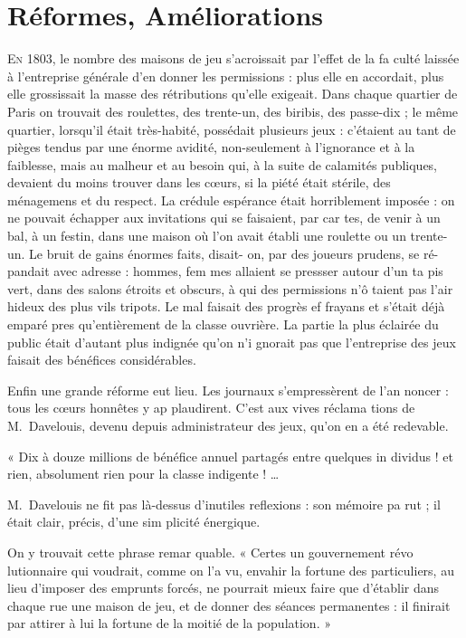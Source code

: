 \chapter
  [Réformes, améliorations]
  {Réformes, Améliorations}

\lettrine{E}{n} 1803, le nombre des maisons de
jeu s'acroissait par l'effet de la fa%
culté laissée à l'entreprise générale
d'en donner les permissions : plus elle
en accordait, plus elle grossissait la
masse des rétributions qu'elle exigeait.
Dans chaque quartier de Paris on
trouvait des roulettes, des trente-un,
des biribis, des passe-dix ; le même
quartier, lorsqu'il était très-habité,
possédait plusieurs jeux : c'étaient au%
tant de pièges tendus par une énorme
avidité, non-seulement à l'ignorance
et à la faiblesse, mais au malheur et
au besoin qui, à la suite de calamités
publiques, devaient du moins trouver
dans les c{\oe}urs, si la piété était stérile,
des ménagemens et du respect. La
crédule espérance était horriblement
imposée : on ne pouvait échapper aux
invitations qui se faisaient, par car%
tes, de venir à un bal, à un festin,
dans une maison où l'on avait établi
une roulette ou un trente-un. Le
bruit de gains énormes faits, disait-%
on, par des joueurs prudens, se ré-%
pandait avec adresse : hommes, fem%
mes allaient se pressser autour d'un ta%
pis vert, dans des salons étroits et
obscurs, à qui des permissions n'ô%
taient pas l'air hideux des plus vils
tripots. Le mal faisait des progrès ef%
frayans et s'était déjà emparé pres%
qu'entièrement de la classe ouvrière.
La partie la plus éclairée du public
était d'autant plus indignée qu'on n'i%
gnorait pas que l'entreprise des jeux
faisait des bénéfices considérables.

Enfin une grande réforme eut lieu.
Les journaux s'empressèrent de l'an%
noncer : tous les c{\oe}urs honnêtes y ap%
plaudirent. C'est aux vives réclama%
tions de M.~Davelouis, devenu depuis
administrateur des jeux, qu'on en a 
été redevable.

« Dix à douze millions de bénéfice
annuel partagés entre quelques in%
dividus ! et rien, absolument rien pour
la classe indigente ! \ldots

M.~Davelouis ne fit pas là-dessus
d'inutiles reflexions : son mémoire pa%
rut ; il était clair, précis, d'une sim%
plicité énergique.

On y trouvait cette phrase remar%
quable.
« Certes un gouvernement révo%
lutionnaire qui voudrait, comme
on l'a vu, envahir la fortune des
particuliers, au lieu d'imposer des
emprunts forcés, ne pourrait mieux
faire que d'établir dans chaque rue
une maison de jeu, et de donner
des séances permanentes : il finirait
par attirer à lui la fortune de la
moitié de la population. »

